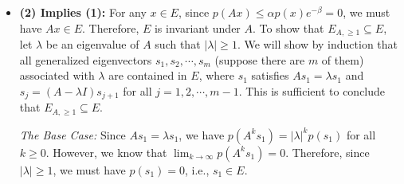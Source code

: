 \documentclass[11 pt]{article}
\begin{document}
\begin{itemize}
		
		\item \textbf{(2) Implies (1):} For any $x\in E$, since $p(Ax)\leq \alpha p(x)e^{-\beta}=0$, we must have $Ax\in E$. Therefore, $E$ is invariant under $A$. To show that $E_{A,\geq 1}\subseteq E$, let $\lambda$ be an eigenvalue of $A$ such that $|\lambda|\geq 1$. We will show by induction that all generalized eigenvectors $s_1,s_2,\cdots,s_m$ (suppose there are $m$ of them) associated with $\lambda$ are contained in $E$, where $s_1$ satisfies $As_1=\lambda s_1$ and $s_j=(A-\lambda I)s_{j+1}$ for all $j=1,2,\cdots,m-1$. This is sufficient to conclude that $E_{A,\geq 1}\subseteq E$.
		
		\textit{The Base Case:} Since $As_1=\lambda s_1$, we have $p(A^ks_1)=|\lambda|^kp(s_1)$ for all $k\geq 0$. However, we know that $\lim_{k\rightarrow\infty}p(A^ks_1)=0$. Therefore, since $|\lambda|\geq 1$, we must have $p(s_1)=0$, i.e., $s_1\in E$.
		

\end{itemize}
\end{document}
